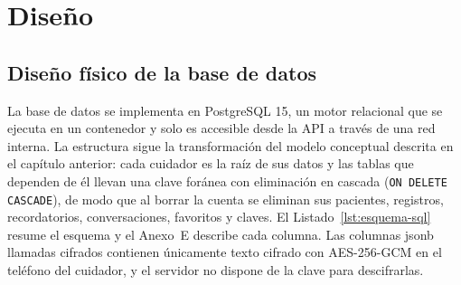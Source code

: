 \chapter[Diseño]{Diseño}

\section[Diseño Físico de la Base de Datos]{Diseño físico de la base de datos}

La base de datos se implementa en PostgreSQL 15, un motor relacional que se
ejecuta en un contenedor y solo es accesible desde la API a través de una red
interna. La estructura sigue la transformación del modelo conceptual descrita en
el capítulo anterior: cada cuidador es la raíz de sus datos y las tablas que
dependen de él llevan una clave foránea con eliminación en cascada
(\texttt{ON DELETE CASCADE}), de modo que al borrar la cuenta se eliminan sus
pacientes, registros, recordatorios, conversaciones, favoritos y claves. El
Listado~\ref{lst:esquema-sql} resume el esquema y el Anexo~E describe cada
columna. Las columnas jsonb llamadas cifrados contienen únicamente texto cifrado
con AES-256-GCM en el teléfono del cuidador, y el servidor no dispone de la clave
para descifrarlas.

